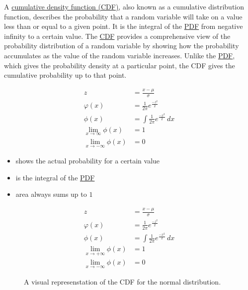 \documentclass[
  a4paper,
]{scrbook}
\providecommand{\tightlist}{%
  \setlength{\itemsep}{0pt}\setlength{\parskip}{0pt}}\usepackage{longtable,booktabs,array}
\begin{document}
A \hyperref[CDF]{cumulative density function (CDF)}, also known as a
cumulative distribution function, describes the probability that a
random variable will take on a value less than or equal to a given
point. It is the integral of the \hyperref[acronyms_PDF]{PDF} from
negative infinity to a certain value. The \hyperref[acronyms_CDF]{CDF}
provides a comprehensive view of the probability distribution of a
random variable by showing how the probability accumulates as the value
of the random variable increases. Unlike the
\hyperref[acronyms_PDF]{PDF}, which gives the probability density at a
particular point, the CDF gives the cumulative probability up to that
point.

\begin{align}
z &= \frac{x-\mu}{\sigma} \nonumber \\
\varphi(x) &= \frac{1}{2\pi}e^{\frac{-z^2}{2}} \\
\phi(x)& = \int \frac{1}{2\pi}e^{\frac{-x^2}{2}} \, dx \\
\lim_{x\to\infty} \phi(x) &= 1 \nonumber \\
\lim_{x\to - \infty} \phi(x) &= 0 \nonumber
\end{align}

\begin{itemize}
\tightlist
\item
  shows the actual probability for a certain value
\item
  is the integral of the \hyperref[acronyms_PDF]{PDF}
\item
  area always sums up to \(1\)
\end{itemize}

\begin{align}
z &= \frac{x-\mu}{\sigma} \nonumber \\
\varphi(x) &= \frac{1}{2\pi}e^{\frac{-z^2}{2}} \nonumber \\
\phi(x)& = \int \frac{1}{2\pi}e^{\frac{-x^2}{2}} \, dx \nonumber \\
\lim_{x\to + \infty} \phi(x) &= 1 \nonumber \\
\lim_{x\to - \infty} \phi(x) &= 0 \nonumber
\end{align}

\begin{figure}[ht]


\caption{\label{fig-cdf-000-sli}A visual represenstation of the CDF for
the normal distribution.}

\end{figure}%
\end{document}
